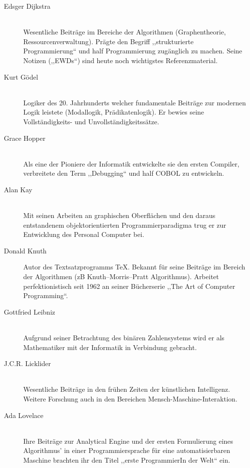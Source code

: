 \begin{description}
  \item[Edsger Dijkstra ] \hfill{} \\
    Wesentliche Beiträge im Bereiche der Algorithmen (Graphentheorie, Ressourcenverwaltung).
    Prägte den Begriff ,,strukturierte Programmierung`` und half Programmierung zugänglich zu machen.
    Seine Notizen (,,EWDs``) sind heute noch wichtigstes Referenzmaterial.

  \item[Kurt Gödel ] \hfill{} \\
    Logiker des 20. Jahrhunderts welcher fundamentale Beiträge zur modernen Logik leistete
    (Modallogik, Prädikatenlogik). Er bewies seine Vollständigkeits- und Unvollständigkeitssätze.

  \item[Grace Hopper ] \hfill{} \\
    Als eine der Pioniere der Informatik entwickelte sie den ersten Compiler, verbreitete den Term ,,Debugging`` und half COBOL zu entwickeln.

  \item[Alan Kay ] \hfill{} \\
    Mit seinen Arbeiten an graphischen Oberflächen und den daraus entstandenem objektorientierten Programmierparadigma trug er zur Entwicklung des Personal Computer bei.

  \item[Donald Knuth ] \hfill{}
    Autor des Textsatzprogramms \TeX. Bekannt für seine Beiträge im Bereich der Algorithmen (zB Knuth–Morris–Pratt Algorithmus). Arbeitet perfektionistisch seit 1962 an seiner Bücherserie ,,The Art of Computer Programming``.

  \item[Gottfried Leibniz ] \hfill{} \\
    Aufgrund seiner Betrachtung des binären Zahlensystems wird er als Mathematiker mit der Informatik in Verbindung gebracht.

  \item[J.C.R. Licklider ] \hfill{} \\
    Wesentliche Beiträge in den frühen Zeiten der künstlichen Intelligenz.
    Weitere Forschung auch in den Bereichen Mensch-Maschine-Interaktion.

  \item[Ada Lovelace ] \hfill{} \\
    Ihre Beiträge zur Analytical Engine und der ersten Formulierung eines Algorithmus' in einer Programmiersprache für eine automatisierbaren Maschine brachten ihr den Titel ,,erste ProgrammierIn der Welt`` ein.


\end{description}
